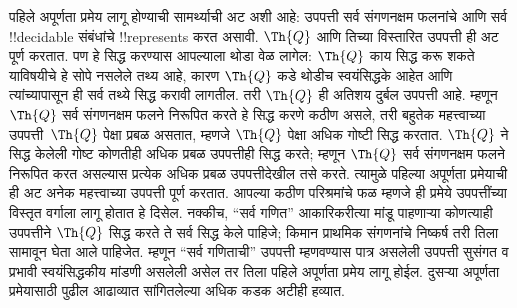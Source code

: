 \documentclass[../../../include/open-logic-section]{subfiles}
\begin{document}
पहिले अपूर्णता प्रमेय लागू होण्याची सामर्थ्याची अट अशी आहे: उपपत्ती
सर्व संगणनक्षम फलनांचे आणि सर्व !!{decidable} संबंधांचे !!{represents}
करत असावी. $\Th{Q}$ आणि तिच्या विस्तारित उपपत्ती ही अट पूर्ण करतात.
पण हे सिद्ध करण्यास आपल्याला थोडा वेळ लागेल: $\Th{Q}$ काय
सिद्ध करू शकते याविषयीचे हे सोपे नसलेले तथ्य आहे, कारण $\Th{Q}$ कडे
थोडीच स्वयंसिद्धके आहेत आणि त्यांच्यापासून ही सर्व तथ्ये सिद्ध
करावी लागतील. तरी $\Th{Q}$ ही अतिशय दुर्बल उपपत्ती आहे.
म्हणून $\Th{Q}$ सर्व संगणनक्षम फलने निरूपित करते हे सिद्ध
करणे कठीण असले, तरी बहुतेक महत्त्वाच्या उपपत्ती~$\Th{Q}$ पेक्षा
प्रबळ असतात, म्हणजे $\Th{Q}$ पेक्षा अधिक गोष्टी सिद्ध करतात.
$\Th{Q}$ ने सिद्ध केलेली गोष्ट कोणतीही अधिक प्रबळ उपपत्तीही
सिद्ध करते; म्हणून $\Th{Q}$ सर्व संगणनक्षम फलने निरूपित करत
असल्यास प्रत्येक अधिक प्रबळ उपपत्तीदेखील तसे करते. त्यामुळे
पहिल्या अपूर्णता प्रमेयाची ही अट अनेक महत्त्वाच्या उपपत्ती पूर्ण करतात.
आपल्या कठीण परिश्रमांचे फळ म्हणजे ही प्रमेये उपपत्तींच्या विस्तृत
वर्गाला लागू होतात हे दिसेल. नक्कीच, ``सर्व गणित'' आकारिकरीत्या
मांडू पाहणाऱ्या कोणत्याही उपपत्तीने $\Th{Q}$ सिद्ध करते ते
सर्व सिद्ध केले पाहिजे; किमान प्राथमिक संगणनांचे निष्कर्ष तरी
तिला सामावून घेता आले पाहिजेत. म्हणून ``सर्व गणिताची'' उपपत्ती
म्हणवण्यास पात्र असलेली उपपत्ती सुसंगत व प्रभावी स्वयंसिद्धकीय
मांडणी असलेली असेल तर तिला पहिले अपूर्णता प्रमेय लागू होईल.
दुसऱ्या अपूर्णता प्रमेयासाठी पुढील आढाव्यात सांगितलेल्या अधिक
कडक अटीही हव्यात.
\end{document}
